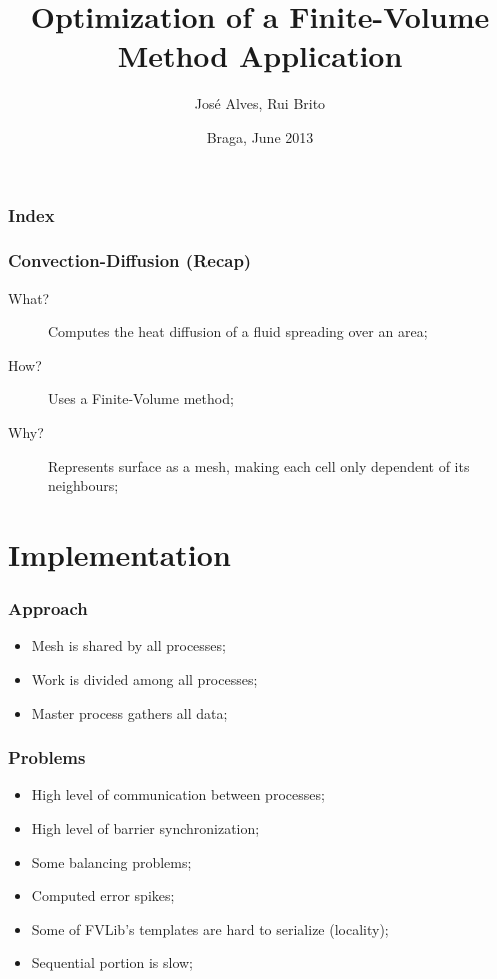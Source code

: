 \documentclass{beamer}
\title{Optimization of a Finite-Volume Method Application}
\author{José Alves, Rui Brito}
\institute[22765, 22781]{
	Universidade do Minho
}
\date{Braga, June 2013}
\begin{document}

\maketitle%

\begin{frame}
	\frametitle{Index}
	\tableofcontents
\end{frame}

\begin{frame}
	\frametitle{Convection-Diffusion (Recap)}
	\begin{description}
		\item [What?] Computes the heat diffusion of a fluid spreading over an area;
		\item [How?] Uses a Finite-Volume method;
		\item [Why?] Represents surface as a mesh, making each cell only dependent of its neighbours;
	\end{description}
\end{frame}

\section{Implementation}

\begin{frame}
	\frametitle{Approach}
	\begin{itemize}
		\item Mesh is shared by all processes;
		\item Work is divided among all processes;
		\item Master process gathers all data;		
	\end{itemize}
\end{frame}


\begin{frame}
	\frametitle{Problems}
	\begin{itemize}		
		\item High level of communication between processes;
		\item High level of barrier synchronization;
		\item Some balancing problems;
		\item Computed error spikes;
		\item Some of FVLib's templates are hard to serialize (locality);
		\item Sequential portion is slow;
	\end{itemize}
\end{frame}
\end{document}
